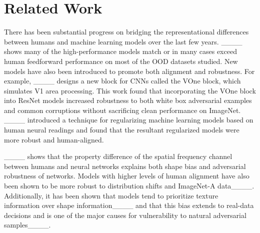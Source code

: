 \section{Related Work}
\label{sec:related}
There has been substantial progress on bridging the representational differences between humans and machine learning models over the last few years. ____ shows many of the high-performance models match or in many cases exceed human feedforward performance on most of the OOD datasets studied. New models have also been introduced to promote both alignment and robustness. For example, ____ designs a new block for CNNs called the VOne block, which simulates V1 area processing. This work found that incorporating the VOne block into ResNet models increased robustness to both white box adversarial examples and common corruptions without sacrificing clean performance on ImageNet. ____ introduced a technique for regularizing machine learning models based on human neural readings and found that the resultant regularized models were more robust and human-aligned.


____ shows that the property difference of the spatial frequency channel between humans and neural networks explains both shape bias and adversarial robustness of networks. 
Models with higher levels of human alignment have also been shown to be more robust to distribution shifts and ImageNet-A data____. Additionally, it has been shown that models tend to prioritize texture information over shape information____ and that this bias extends to real-data decisions and is one of the major causes for vulnerability to natural adversarial samples____.